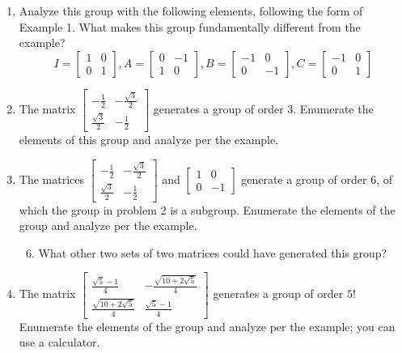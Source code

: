 \documentclass[../gatm.tex]{subfiles}
\begin{document}
\begin{enumerate}
\item Analyze this group with the following elements, following the form of Example 1. What makes this group fundamentally different from the example?
$$I=\left[\begin{array}{cc} 1 & 0 \\ 0 & 1 \end{array}\right], A=\left[\begin{array}{cc} 0 & -1 \\ 1 & 0 \end{array}\right], B=\left[\begin{array}{cc} -1 & 0 \\ 0 & -1 \end{array}\right], C=\left[\begin{array}{cc} -1 & 0 \\ 0 & 1 \end{array}\right]$$
\item The matrix $\left[\begin{array}{cc} -\frac{1}{2} & -\frac{\sqrt{3}}{2} \\ \frac{\sqrt{3}}{2} & -\frac{1}{2}\end{array}\right]$ generates a group of order $3$. Enumerate the elements of this group and analyze per the example.
\item The matrices $\left[\begin{array}{cc} -\frac{1}{2} & -\frac{\sqrt{3}}{2} \\ \frac{\sqrt{3}}{2} & -\frac{1}{2}\end{array}\right]$ and $\left[\begin{array}{cc} 1 & 0 \\ 0 & -1 \end{array}\right]$ generate a group of order $6$, of which the group in problem 2 is a subgroup. Enumerate the elements of the group and analyze per the example.
\begin{enumerate}
\setcounter{enumii}{5}
\item What other two sets of two matrices could have generated this group?
\end{enumerate}
\item The matrix $\left[\begin{array}{cc} \frac{\sqrt{5}-1}{4} & -\frac{\sqrt{10+2\sqrt{5}}}{4} \\ \frac{\sqrt{10+2\sqrt{5}}}{4} & \frac{\sqrt{5}-1}{4} \end{array}\right]$ generates a group of order $5$! Enumerate the elements of the group and analyze per the example; you can use a calculator.

\end{enumerate}
\end{document}
